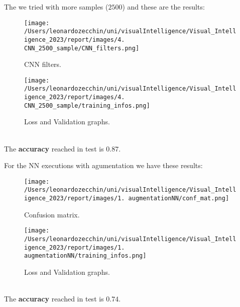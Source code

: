 \documentclass{report}
\def\weight{0.7}
\begin{document}
The we tried with more samples ($2500$) and these are the results:\\
\begin{figure}[ht!]
    \centering
    \begin{minipage}[b]{\weight\linewidth}
      \texttt{[image: /Users/leonardozecchin/uni/visualIntelligence/Visual\_Intelligence\_2023/report/images/4. CNN\_2500\_sample/CNN\_filters.png]}
      \caption{CNN filters.}
      \label{fig:image1}
    \end{minipage}
    \hspace{0.5cm}
    \begin{minipage}[b]{\weight\linewidth}
      \texttt{[image: /Users/leonardozecchin/uni/visualIntelligence/Visual\_Intelligence\_2023/report/images/4. CNN\_2500\_sample/training\_infos.png]}
      \caption{Loss and Validation graphs.}
      \label{fig:image2}
    \end{minipage}
\end{figure}\\
The \textbf{accuracy} reached in test is $0.87$.\\
\pagebreak

For the NN executions with agumentation we have these results:
\begin{figure}[ht!]
    \centering
    \begin{minipage}[b]{\weight\linewidth}
      \texttt{[image: /Users/leonardozecchin/uni/visualIntelligence/Visual\_Intelligence\_2023/report/images/1. augmentationNN/conf\_mat.png]}
      \caption{Confusion matrix.}
      \label{fig:image1}
    \end{minipage}
    \hspace{0.5cm}
    \begin{minipage}[b]{\weight\linewidth}
      \texttt{[image: /Users/leonardozecchin/uni/visualIntelligence/Visual\_Intelligence\_2023/report/images/1. augmentationNN/training\_infos.png]}
      \caption{Loss and Validation graphs.}
      \label{fig:image2}
    \end{minipage}
\end{figure}\\
The \textbf{accuracy} reached in test is $0.74$.\\

\pagebreak
\end{document}
